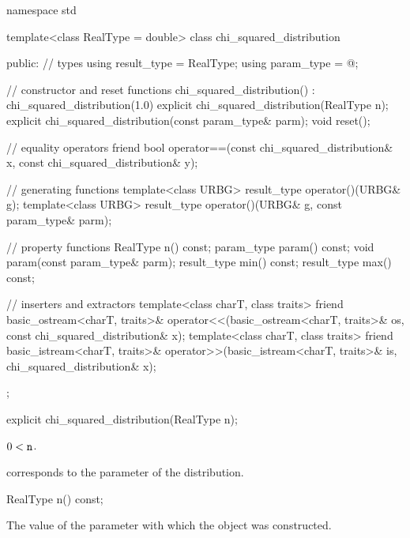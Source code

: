 %
%
\begin{codeblock}
namespace std {
  template<class RealType = double>
  class chi_squared_distribution {
  public:
    // types
    using result_type = RealType;
    using param_type  = @\unspec@;

    // constructor and reset functions
    chi_squared_distribution() : chi_squared_distribution(1.0) {}
    explicit chi_squared_distribution(RealType n);
    explicit chi_squared_distribution(const param_type& parm);
    void reset();

    // equality operators
    friend bool operator==(const chi_squared_distribution& x, const chi_squared_distribution& y);

    // generating functions
    template<class URBG>
      result_type operator()(URBG& g);
    template<class URBG>
      result_type operator()(URBG& g, const param_type& parm);

    // property functions
    RealType n() const;
    param_type param() const;
    void param(const param_type& parm);
    result_type min() const;
    result_type max() const;

    // inserters and extractors
    template<class charT, class traits>
      friend basic_ostream<charT, traits>&
        operator<<(basic_ostream<charT, traits>& os, const chi_squared_distribution& x);
    template<class charT, class traits>
      friend basic_istream<charT, traits>&
        operator>>(basic_istream<charT, traits>& is, chi_squared_distribution& x);
  };
}
\end{codeblock}


%
\begin{itemdecl}
explicit chi_squared_distribution(RealType n);
\end{itemdecl}

\begin{itemdescr}
\pnum
\expects
$0 < \texttt{\protect n}$.

\pnum
\remarks
{} corresponds to the parameter of the distribution.
\end{itemdescr}

%
\begin{itemdecl}
RealType n() const;
\end{itemdecl}

\begin{itemdescr}
\pnum
\returns
The value of the  parameter
 with which the object was constructed.
\end{itemdescr}

